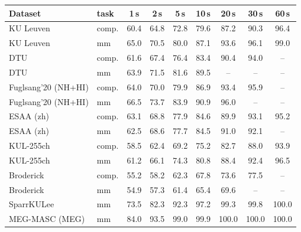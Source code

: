 \begin{tabular}{llccccccc}\toprule
Dataset & task & 1\,s & 2\,s & 5\,s & 10\,s & 20\,s & 30\,s & 60\,s \\\midrule
KU Leuven & comp. & 60.4 & 64.8 & 72.8 & 79.6 & 87.2 & 90.3 & 96.4 \\
KU Leuven & mm & 65.0 & 70.5 & 80.0 & 87.1 & 93.6 & 96.1 & 99.0 \\
DTU & comp. & 61.6 & 67.4 & 76.4 & 83.4 & 90.4 & 94.0 & -- \\
DTU & mm & 63.9 & 71.5 & 81.6 & 89.5 & -- & -- & -- \\
Fuglsang'20 (NH+HI) & comp. & 64.0 & 70.0 & 79.9 & 86.9 & 93.4 & 95.9 & -- \\
Fuglsang'20 (NH+HI) & mm & 66.5 & 73.7 & 83.9 & 90.9 & 96.0 & -- & -- \\
ESAA (zh) & comp. & 63.1 & 68.8 & 77.9 & 84.6 & 89.9 & 93.1 & 95.2 \\
ESAA (zh) & mm & 62.5 & 68.6 & 77.7 & 84.5 & 91.0 & 92.1 & -- \\
KUL-255ch & comp. & 58.5 & 62.4 & 69.2 & 75.2 & 82.7 & 88.0 & 93.9 \\
KUL-255ch & mm & 61.2 & 66.1 & 74.3 & 80.8 & 88.4 & 92.4 & 96.5 \\
Broderick & comp. & 55.2 & 58.2 & 62.3 & 67.8 & 73.6 & 77.5 & -- \\
Broderick & mm & 54.9 & 57.3 & 61.4 & 65.4 & 69.6 & -- & -- \\
SparrKULee & mm & 73.5 & 82.3 & 92.3 & 97.2 & 99.3 & 99.8 & 100.0 \\
MEG-MASC (MEG) & mm & 84.0 & 93.5 & 99.0 & 99.9 & 100.0 & 100.0 & 100.0 \\
\bottomrule\end{tabular}

